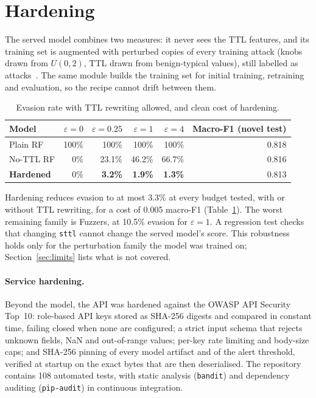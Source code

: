 \documentclass[11pt,a4paper]{article}
\newcommand{\code}[1]{\texttt{#1}}
\begin{document}
\section{Hardening}
\label{sec:hardening}

The served model combines two measures: it never sees the TTL features, and
its training set is augmented with perturbed copies of every training attack
(knobs drawn from $U(0,2)$, TTL drawn from benign-typical values), still
labelled as attacks~\cite{goodfellow2015}. The same module builds the
training set for initial training, retraining and evaluation, so the recipe
cannot drift between them.

\begin{table}[h]
\centering
\small
\caption{Evasion rate with TTL rewriting allowed, and clean cost of hardening.}
\label{tab:hardening}
\begin{tabular}{@{}lrrrrr@{}}
\toprule
Model & $\varepsilon=0$ & $\varepsilon=0.25$ & $\varepsilon=1$ & $\varepsilon=4$ & Macro-F1 (novel test) \\
\midrule
Plain RF          & 100\% & 100\% & 100\% & 100\% & 0.818 \\
No-TTL RF         & 0\%   & 23.1\% & 46.2\% & 66.7\% & 0.816 \\
\textbf{Hardened} & 0\%   & \textbf{3.2\%} & \textbf{1.9\%} & \textbf{1.3\%} & 0.813 \\
\bottomrule
\end{tabular}
\end{table}

Hardening reduces evasion to at most 3.3\% at every budget tested, with or
without TTL rewriting, for a cost of 0.005 macro-F1 (Table~\ref{tab:hardening}).
The worst remaining family is Fuzzers, at 10.5\% evasion for $\varepsilon=1$.
A regression test checks that changing \code{sttl} cannot change the served
model's score. This robustness holds only for the perturbation family the
model was trained on; Section~\ref{sec:limits} lists what is not covered.

\paragraph{Service hardening.} Beyond the model, the API was hardened against
the OWASP API Security Top~10: role-based API keys stored as SHA-256 digests
and compared in constant time, failing closed when none are configured; a
strict input schema that rejects unknown fields, NaN and out-of-range values;
per-key rate limiting and body-size caps; and SHA-256 pinning of every model
artifact and of the alert threshold, verified at startup on the exact bytes
that are then deserialised. The repository contains 108 automated tests,
with static analysis (\code{bandit}) and dependency auditing
(\code{pip-audit}) in continuous integration.
\end{document}

